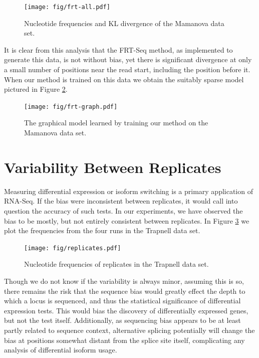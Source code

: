 \documentclass[letterpaper]{article}
\begin{document}
\begin{figure}[H]
\begin{center}
\texttt{[image: fig/frt-all.pdf]}
\end{center}
\caption{Nucleotide frequencies and KL divergence of the Mamanova data set.}
\label{fig:frtall}
\end{figure}

It is clear from this analysis that the FRT-Seq method, as implemented to
generate this data, is not without bias, yet there is significant divergence at
only a small number of positions near the read start, including the position
before it. When our method is trained on this data we obtain the suitably sparse
model pictured in Figure
\ref{fig:frtgraph}.

\begin{figure}[H]
\begin{center}
\texttt{[image: fig/frt-graph.pdf]}
\end{center}
\caption{The graphical model learned by training our method on the Mamanova data
set.}
\label{fig:frtgraph}
\end{figure}


\section{Variability Between Replicates}

Measuring differential expression or isoform switching is a primary application of
RNA-Seq. If the bias were inconsistent between replicates, it would call into
question the accuracy of such tests. In our experiments, we have observed the
bias to be mostly, but not entirely consistent between replicates. In Figure
\ref{fig:replicates} we
plot the frequencies from the four runs in the Trapnell data set.

\begin{figure}[H]
\begin{center}
\texttt{[image: fig/replicates.pdf]}
\end{center}
\caption{Nucleotide frequencies of replicates in the Trapnell data set.}
\label{fig:replicates}
\end{figure}

Though we do not know if the variability is always minor, assuming this is so,
there remains the risk that the sequence bias would greatly effect the depth to
which a locus is sequenced, and thus the statistical significance of
differential expression tests. This would bias the discovery of differentially
expressed genes, but not the test itself.  Additionally, as sequencing bias
appears to be at least partly related to sequence context, alternative splicing
potentially will change the bias at positions somewhat distant from the splice
site itself, complicating any analysis of differential isoform usage.
\end{document}
